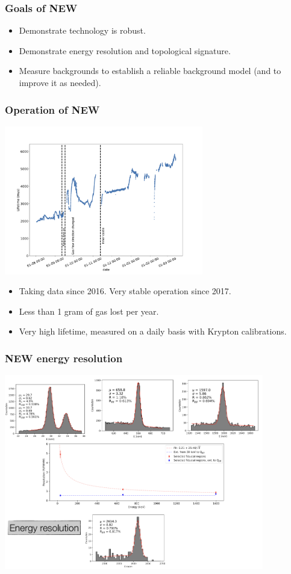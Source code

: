 \begin{frame}
\frametitle{Goals of NEW} 
\begin{itemize}
\item Demonstrate technology is robust. 
\item Demonstrate energy resolution and topological signature. 
\item Measure backgrounds to establish a reliable background model (and to improve it as needed). 
\end{itemize}
\end{frame}

\begin{frame}
\frametitle{Operation of NEW} 
 \begin{center}
 \includegraphics[width=0.65\textwidth]{moriond/lifetime_evolution.png}
\end{center}
\begin{itemize}
\item Taking data since 2016. Very stable operation since 2017.
\item Less than 1 gram of gas lost per year. 
\item Very high lifetime, measured on a daily basis with Krypton calibrations. 
\end{itemize}
\end{frame}

\begin{frame}
 \frametitle{NEW energy resolution} 
 \begin{center}
\includegraphics[width=0.85\textwidth]{moriond/new_energy_res.png}
\end{center}
\end{frame}

